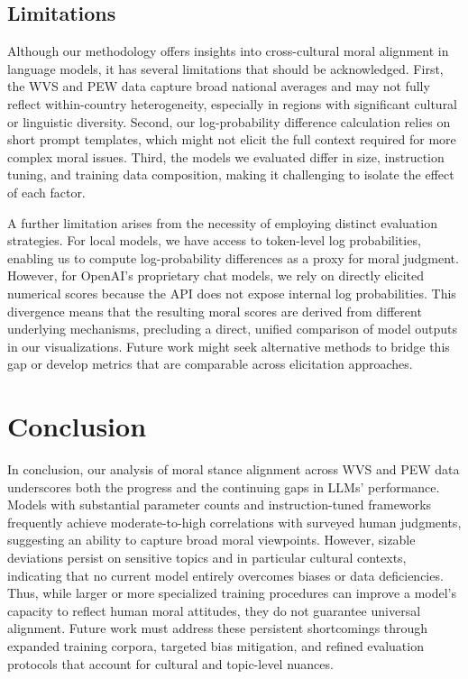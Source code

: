 \documentclass[11pt]{article}
\begin{document}
\subsection{Limitations}
\label{sec:limitations}

Although our methodology offers insights into cross-cultural moral alignment in language models, it has several limitations that should be acknowledged. First, the WVS and PEW data capture broad national averages and may not fully reflect within-country heterogeneity, especially in regions with significant cultural or linguistic diversity. Second, our log-probability difference calculation relies on short prompt templates, which might not elicit the full context required for more complex moral issues. Third, the models we evaluated differ in size, instruction tuning, and training data composition, making it challenging to isolate the effect of each factor.

A further limitation arises from the necessity of employing distinct evaluation strategies. For local models, we have access to token-level log probabilities, enabling us to compute log-probability differences as a proxy for moral judgment. However, for OpenAI’s proprietary chat models, we rely on directly elicited numerical scores because the API does not expose internal log probabilities. This divergence means that the resulting moral scores are derived from different underlying mechanisms, precluding a direct, unified comparison of model outputs in our visualizations. Future work might seek alternative methods to bridge this gap or develop metrics that are comparable across elicitation approaches.


\section{Conclusion}
In conclusion, our analysis of moral stance alignment across WVS and PEW data underscores both the progress and the continuing gaps in LLMs' performance. Models with substantial parameter counts and instruction-tuned frameworks frequently achieve moderate-to-high correlations with surveyed human judgments, suggesting an ability to capture broad moral viewpoints. However, sizable deviations persist on sensitive topics and in particular cultural contexts, indicating that no current model entirely overcomes biases or data deficiencies. Thus, while larger or more specialized training procedures can improve a model’s capacity to reflect human moral attitudes, they do not guarantee universal alignment. Future work must address these persistent shortcomings through expanded training corpora, targeted bias mitigation, and refined evaluation protocols that account for cultural and topic-level nuances.
\end{document}
